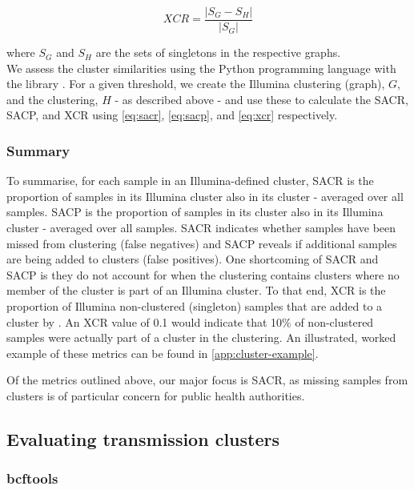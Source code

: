\begin{equation}
\label{eq:xcr}
    XCR = \frac{|S_G-S_H|}{|S_G|}
\end{equation}

where $S_G$ and $S_H$ are the sets of singletons in the respective graphs. \\

\noindent
We assess the cluster similarities using the Python programming language with the  library \cite{networkx}. For a given threshold, we create the Illumina clustering (graph), $G$, and the \ont{} clustering, $H$ - as described above - and use these to calculate the SACR, SACP, and XCR using \autoref{eq:sacr}, \autoref{eq:sacp}, and \autoref{eq:xcr} respectively.

\subsubsection{Summary}

To summarise, for each sample in an Illumina-defined cluster, SACR is the proportion of samples in its Illumina cluster also in its \ont{} cluster - averaged over all samples. SACP is the proportion of samples in its \ont{} cluster also in its Illumina cluster - averaged over all samples. SACR indicates whether samples have been missed from \ont{} clustering (false negatives) and SACP reveals if additional samples are being added to \ont{} clusters (false positives). One shortcoming of SACR and SACP is they do not account for when the \ont{} clustering contains clusters where no member of the cluster is part of an Illumina cluster. To that end, XCR is the proportion of Illumina non-clustered (singleton) samples that are added to a cluster by \ont{}. An XCR value of 0.1 would indicate that 10\% of non-clustered samples were actually part of a cluster in the \ont{} clustering. An illustrated, worked example of these metrics can be found in \autoref{app:cluster-example}.

Of the metrics outlined above, our major focus is SACR, as missing samples from clusters is of particular concern for public health authorities.

\subsection{Evaluating \ont{} transmission clusters}
\label{sec:eval-clusters}

\subsubsection{bcftools}
\label{sec:bcftools-clustering}

